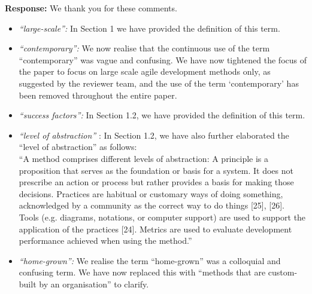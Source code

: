 \documentclass[a4paper,twoside,11pt]{reviewresponse}
\begin{document}
\textbf{Response:}
We thank you for these comments. 
\begin{itemize}
	\item \textit{``large-scale'':} In Section 1 we have provided the definition of this term. 
	\item \textit{``contemporary'':} We now realise that the continuous use of the term ``contemporary'' was vague and confusing. We have now tightened the focus of the paper to focus on large scale agile development methods only, as suggested by the reviewer team, and the use of the term `contemporary' has been removed throughout the entire paper. 
	\item \textit{``success factors'':} In Section 1.2, we have provided the definition of this term.
	\item \textit{``level of abstraction'' }: In Section 1.2, we have also further elaborated the ``level of abstraction'' as follows: \\
``A method comprises different levels of abstraction: A principle is a proposition that serves as the foundation or basis for a system. It does not prescribe an action or process but rather provides a basis for making those decisions. Practices are habitual or customary ways of doing something,
acknowledged by a community as the correct way to do things [25], [26]. Tools (e.g. diagrams, notations, or computer support) are used to support the application of the practices [24]. Metrics are used to evaluate development performance achieved when using the method.'' 
	\item \textit{``home-grown'':} We realise the term ``home-grown'' was a colloquial and confusing term. We have now replaced this with ``methods that are custom-built by an organisation'' to clarify.
\end{itemize}
\end{document}

